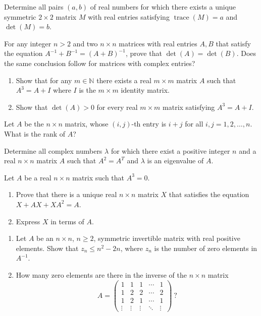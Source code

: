 \documentclass[12pt]{article}
\begin{document}
\begin{problems}
\item Determine all pairs $(a,b)$ of real numbers for which there exists a unique symmetric $2\times 2$ matrix $M$ with real entries satisfying $\operatorname{trace}(M)=a$ and $\det(M)=b$.

\item For any integer $n>2$ and two $n\times n$ matrices with real entries $A,B$ that satisfy the equation $A^{-1}+B^{-1}=(A+B)^{-1}$, prove that $\det(A)=\det(B)$. Does the same conclusion follow for matrices with complex entries?

\item
\begin{enumerate}[label=(\alph*)]
\item Show that for any $m\in\mathbb{N}$ there exists a real $m\times m$ matrix $A$ such that $A^3=A+I$ where $I$ is the $m\times m$ identity matrix.
\item Show that $\det(A)>0$ for every real $m\times m$ matrix satisfying $A^3=A+I$.
\end{enumerate}

\item Let $A$ be the $n\times n$ matrix, whose $(i,j)$-th entry is $i+j$ for all $i,j=1,2,\dots,n$. What is the rank of $A$?

\item Determine all complex numbers $\lambda$ for which there exist a positive integer $n$ and a real $n\times n$ matrix $A$ such that $A^2=A^T$ and $\lambda$ is an eigenvalue of $A$.

\item Let $A$ be a real $n\times n$ matrix such that $A^3=0$.
\begin{enumerate}[label=(\alph*)]
\item Prove that there is a unique real $n\times n$ matrix $X$ that satisfies the equation $X+AX+XA^2=A$.
\item Express $X$ in terms of $A$.
\end{enumerate}

\item
\begin{enumerate}[label=(\alph*)]
\item Let $A$ be an $n\times n$, $n\ge 2$, symmetric invertible matrix with real positive elements. Show that $z_n \le n^2-2n$, where $z_n$ is the number of zero elements in $A^{-1}$.
\item How many zero elements are there in the inverse of the $n\times n$ matrix
\[
A = \begin{pmatrix}
1 & 1 & 1 & \cdots & 1\\
1 & 2 & 2 & \cdots & 2\\
1 & 2 & 1 & \cdots & 1\\
\vdots & \vdots & \vdots & \ddots & \vdots
\end{pmatrix}\ ?
\]
\end{enumerate}


\end{problems}
\end{document}
